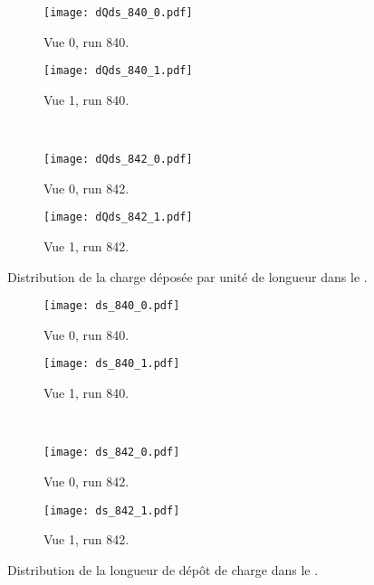       \begin{figure}[htbp]
        \centering
        \begin{subfigure}[t]{0.48\textwidth}
          \centering
          \texttt{[image: dQds\_840\_0.pdf]}
          \caption[]{Vue 0, run 840.}
        \end{subfigure}\hfill
        \begin{subfigure}[t]{0.48\textwidth}
          \centering
          \texttt{[image: dQds\_840\_1.pdf]}
           \caption[]{Vue 1, run 840.}
        \end{subfigure}\\
        \begin{subfigure}[t]{0.48\textwidth}
          \centering
          \texttt{[image: dQds\_842\_0.pdf]}
          \caption[]{Vue 0, run 842.}
        \end{subfigure}\hfill
        \begin{subfigure}[t]{0.48\textwidth}
          \centering
          \texttt{[image: dQds\_842\_1.pdf]}
          \caption[]{Vue 1, run 842.}
        \end{subfigure}
        \caption[Distribution de la charge déposée par unité de longueur dans le \TOO{}.]{\label{fig::dqds_840_842}Distribution de la charge déposée par unité de longueur dans le \TOO{}.}
      \end{figure}

      \begin{figure}[htbp]
        \centering
        \begin{subfigure}[t]{0.48\textwidth}
          \centering
          \texttt{[image: ds\_840\_0.pdf]}
          \caption[]{Vue 0, run 840.}
        \end{subfigure}\hfill
        \begin{subfigure}[t]{0.48\textwidth}
          \centering
          \texttt{[image: ds\_840\_1.pdf]}
          \caption[]{Vue 1, run 840.}
        \end{subfigure}\\
        \begin{subfigure}[t]{0.48\textwidth}
          \centering
          \texttt{[image: ds\_842\_0.pdf]}
          \caption[]{Vue 0, run 842.}
        \end{subfigure}\hfill
        \begin{subfigure}[t]{0.48\textwidth}
          \centering
          \texttt{[image: ds\_842\_1.pdf]}
          \caption[]{Vue 1, run 842.}
        \end{subfigure}
        \caption[Distribution de la longueur de dépôt de charge dans le \TOO{}.]{\label{fig::ds_840_842}Distribution de la longueur de dépôt de charge dans le \TOO{}.}
      \end{figure}

